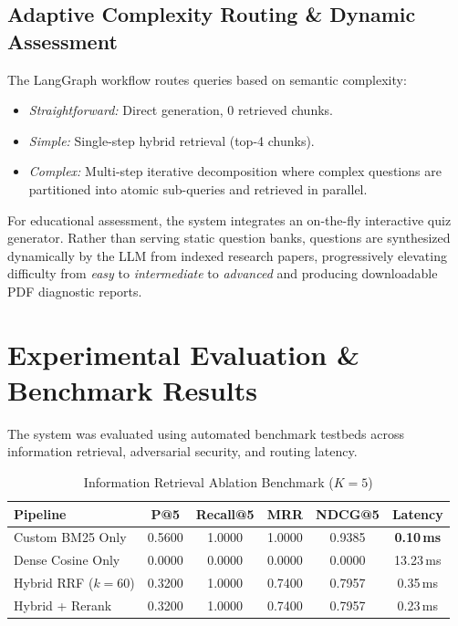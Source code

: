 \documentclass[conference]{IEEEtran}
\begin{document}
\subsection{Adaptive Complexity Routing \& Dynamic Assessment}
The LangGraph workflow routes queries based on semantic complexity:
\begin{itemize}
    \item \textit{Straightforward:} Direct generation, 0 retrieved chunks.
    \item \textit{Simple:} Single-step hybrid retrieval (top-4 chunks).
    \item \textit{Complex:} Multi-step iterative decomposition where complex questions are partitioned into atomic sub-queries and retrieved in parallel.
\end{itemize}
For educational assessment, the system integrates an on-the-fly interactive quiz generator. Rather than serving static question banks, questions are synthesized dynamically by the LLM from indexed research papers, progressively elevating difficulty from \textit{easy} to \textit{intermediate} to \textit{advanced} and producing downloadable PDF diagnostic reports.

\section{Experimental Evaluation \& Benchmark Results}
The system was evaluated using automated benchmark testbeds across information retrieval, adversarial security, and routing latency.

\begin{table}[htbp]
\caption{Information Retrieval Ablation Benchmark ($K=5$)}
\label{tab:retrieval}
\centering
\begin{tabularx}{\columnwidth}{lccccc}
\toprule
\textbf{Pipeline} & \textbf{P@5} & \textbf{Recall@5} & \textbf{MRR} & \textbf{NDCG@5} & \textbf{Latency} \\
\midrule
Custom BM25 Only & 0.5600 & 1.0000 & 1.0000 & 0.9385 & \textbf{0.10\,ms} \\
Dense Cosine Only & 0.0000 & 0.0000 & 0.0000 & 0.0000 & 13.23\,ms \\
Hybrid RRF ($k=60$) & 0.3200 & 1.0000 & 0.7400 & 0.7957 & 0.35\,ms \\
Hybrid + Rerank & 0.3200 & 1.0000 & 0.7400 & 0.7957 & 0.23\,ms \\
\bottomrule
\end{tabularx}
\end{table}
\end{document}
